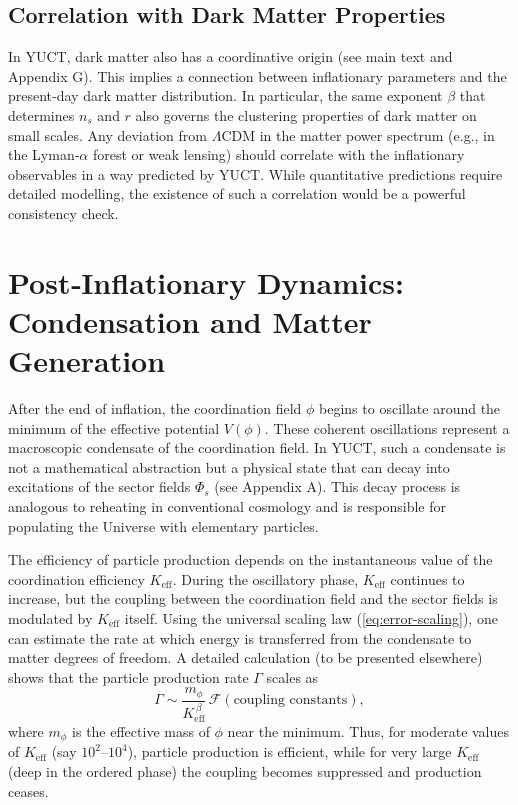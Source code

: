 \documentclass[12pt]{article}
\theoremstyle{remark}
\newcommand{\Keff}{K_{\mathrm{eff}}}
\begin{document}
	\subsection{Correlation with Dark Matter Properties}
	
	In YUCT, dark matter also has a coordinative origin (see main text and Appendix G). This implies a connection between inflationary parameters and the present‑day dark matter distribution. In particular, the same exponent $\beta$ that determines $n_s$ and $r$ also governs the clustering properties of dark matter on small scales. Any deviation from $\Lambda$CDM in the matter power spectrum (e.g., in the Lyman‑$\alpha$ forest or weak lensing) should correlate with the inflationary observables in a way predicted by YUCT. While quantitative predictions require detailed modelling, the existence of such a correlation would be a powerful consistency check.
	
	\section{Post‑Inflationary Dynamics: Condensation and Matter Generation}
	\label{sec:postinflation}
	
	After the end of inflation, the coordination field $\phi$ begins to oscillate around the minimum of the effective potential $V(\phi)$. These coherent oscillations represent a macroscopic condensate of the coordination field. In YUCT, such a condensate is not a mathematical abstraction but a physical state that can decay into excitations of the sector fields $\Phi_s$ (see Appendix A). This decay process is analogous to reheating in conventional cosmology and is responsible for populating the Universe with elementary particles.
	
	The efficiency of particle production depends on the instantaneous value of the coordination efficiency $\Keff$. During the oscillatory phase, $\Keff$ continues to increase, but the coupling between the coordination field and the sector fields is modulated by $\Keff$ itself. Using the universal scaling law (\ref{eq:error-scaling}), one can estimate the rate at which energy is transferred from the condensate to matter degrees of freedom. A detailed calculation (to be presented elsewhere) shows that the particle production rate $\Gamma$ scales as
	\begin{equation}
		\Gamma \sim \frac{m_\phi}{\Keff^{\,\beta}} \, \mathcal{F}(\text{coupling constants}),
		\label{eq:gamma}
	\end{equation}
	where $m_\phi$ is the effective mass of $\phi$ near the minimum. Thus, for moderate values of $\Keff$ (say $10^2$–$10^4$), particle production is efficient, while for very large $\Keff$ (deep in the ordered phase) the coupling becomes suppressed and production ceases.
	
\end{document}
